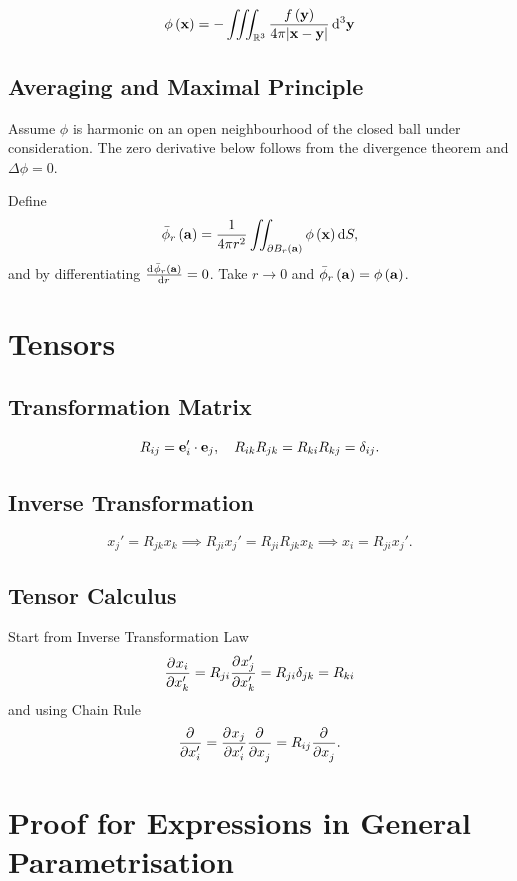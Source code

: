 \documentclass{article}
\theoremstyle{definition}
\theoremstyle{remark}
\DeclarePairedDelimiter{\abs}{\lvert}{\rvert}
\newcommand{\vdot}{\cdot}
\newcommand{\kronecker}{\delta}
\newcommand{\oiint}{\iint}
\begin{document}
\[
    \phi\pqty{\vb{x}} = -\iiint_{\mathbb R^3} \frac{f\pqty{\vb{y}}}{4 \pi \abs{\vb{x} - \vb{y}}} \dd[3]{\vb{y}}
\]

\subsection*{Averaging and Maximal Principle}
Assume $\phi$ is harmonic on an open neighbourhood of the closed ball under consideration. The zero derivative below follows from the divergence theorem and $\Delta\phi=0$.


Define
\[
    \bar{\phi}_r \pqty{\vb{a}} = \frac{1}{4 \pi r^2} \oiint_{\partial B_r \pqty{\vb{a}}} \phi \pqty{\vb{x}} \dd{S},
\]
and by differentiating \(\dv*{\bar{\phi}_r \pqty{\vb{a}}}{r} = 0\). Take \(r \to 0\) and \(\bar{\phi}_r \pqty{\vb{a}} = \phi \pqty{\vb{a}}\).

\section*{Tensors}

\subsection*{Transformation Matrix}

\[
    R_{ij} = \vb{e}'_i \vdot \vb{e}_j, \quad R_{ik} R_{jk} = R_{ki} R_{kj} = \kronecker_{ij}.
\]

\subsection*{Inverse Transformation}

\[
    x_j' = R_{jk} x_k \implies R_{ji} x_j' = R_{ji} R_{jk} x_k \implies x_i = R_{ji} x_j'.
\]

\subsection*{Tensor Calculus}

Start from Inverse Transformation Law
\[
    \pdv{x_i}{x_k'} = R_{ji} \pdv{x_j'}{x_k'} = R_{ji} \kronecker_{jk} = R_{ki}
\]
and using Chain Rule
\[
    \pdv{x_i'} = \pdv{x_j}{x_i'} \pdv{x_j} = R_{ij} \pdv{x_j}.
\]

\clearpage

\section*{Proof for Expressions in General Parametrisation}
\end{document}
